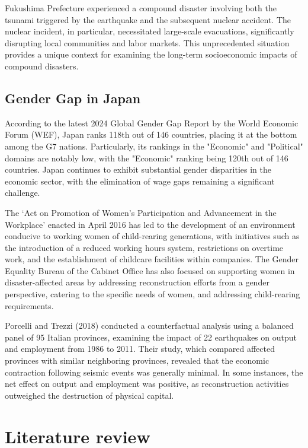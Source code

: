 \documentclass[12pt,halfline,a4paper]{ouparticle}
\begin{document}
Fukushima Prefecture experienced a compound disaster involving both the tsunami triggered by the earthquake and the subsequent nuclear accident. The nuclear incident, in particular, necessitated large-scale evacuations, significantly disrupting local communities and labor markets. This unprecedented situation provides a unique context for examining the long-term socioeconomic impacts of compound disasters.

\subsection{Gender Gap in Japan}
\label{sec5.1}

According to the latest 2024 Global Gender Gap Report by the World Economic Forum (WEF), Japan ranks 118th out of 146 countries, placing it at the bottom among the G7 nations. Particularly, its rankings in the "Economic" and "Political" domains are notably low, with the "Economic" ranking being 120th out of 146 countries. Japan continues to exhibit substantial gender disparities in the economic sector, with the elimination of wage gaps remaining a significant challenge.

The ‘Act on Promotion of Women’s Participation and Advancement in the Workplace’ enacted in April 2016 has led to the development of an environment conducive to working women of child-rearing generations, with initiatives such as the introduction of a reduced working hours system, restrictions on overtime work, and the establishment of childcare facilities within companies. The Gender Equality Bureau of the Cabinet Office has also focused on supporting women in disaster-affected areas by addressing reconstruction efforts from a gender perspective, catering to the specific needs of women, and addressing child-rearing requirements.

\cite{Porcelli2019TheItaly} Porcelli and Trezzi (2018) conducted a counterfactual analysis using a balanced panel of 95 Italian provinces, examining the impact of 22 earthquakes on output and employment from 1986 to 2011. Their study, which compared affected provinces with similar neighboring provinces, revealed that the economic contraction following seismic events was generally minimal. In some instances, the net effect on output and employment was positive, as reconstruction activities outweighed the destruction of physical capital.



\section{Literature review}
\label{sec3}
\end{document}
